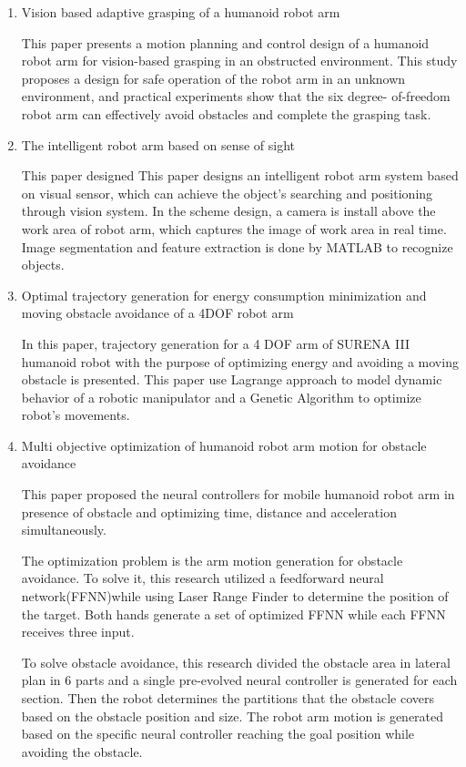 \documentclass[10pt,twocolumn,letterpaper]{article}
\begin{document}
\begin{enumerate}
\item Vision\- based adaptive grasping of a humanoid robot arm

This paper presents a motion planning and control design of a humanoid robot arm for vision-based grasping in an obstructed environment. This study proposes a design for safe operation of the robot arm in an unknown environment, and practical experiments show that the six degree- of-freedom robot arm can effectively avoid obstacles and complete the grasping task.

\item The intelligent robot arm based on sense of sight

This paper designed This paper designs an intelligent robot arm system based on visual sensor,  which can achieve the object's searching and positioning through vision system. In the scheme design, a camera is install above the work area of robot arm, which captures the image of work area in real time. Image segmentation and feature extraction is done by MATLAB to recognize objects. 

\item Optimal trajectory generation for energy consumption minimization and moving obstacle avoidance of a 4DOF robot arm

In this paper, trajectory generation for a 4 DOF arm of SURENA III humanoid robot with the purpose of optimizing energy and avoiding a moving obstacle is presented. This paper use Lagrange approach to model dynamic behavior of a robotic manipulator and a Genetic Algorithm to optimize robot's movements.

\item Multi objective optimization of humanoid robot arm motion for obstacle avoidance

This paper proposed the neural controllers for mobile humanoid robot arm in presence of obstacle and optimizing time, distance and acceleration simultaneously.

The optimization problem is the arm motion generation for obstacle avoidance. To solve it, this research utilized a feedforward neural network(FFNN)while using Laser Range Finder to determine the position of the target. Both hands generate a set of optimized FFNN while each FFNN receives three input.

To solve obstacle avoidance, this research divided the obstacle area in lateral plan in 6 parts and a single pre-evolved neural controller is generated for each section. Then the robot determines the partitions that the obstacle covers based on the obstacle position and size. The robot arm motion is generated based on the specific neural controller reaching the goal position while avoiding the obstacle. 


\end{enumerate}
\end{document}

